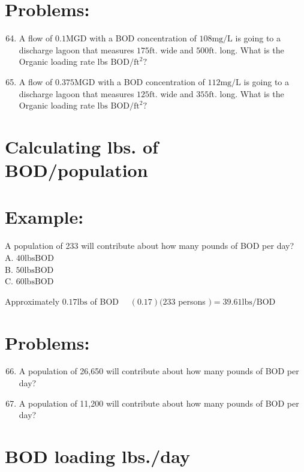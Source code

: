 \documentclass[10pt]{article}
\begin{document}
\section{Problems:}
\begin{enumerate}
  \setcounter{enumi}{63}
  \item A flow of $0.1 \mathrm{MGD}$ with a BOD concentration of $108 \mathrm{mg} / \mathrm{L}$ is going to a discharge lagoon that measures $175 \mathrm{ft}$. wide and $500 \mathrm{ft}$. long. What is the Organic loading rate lbs $\mathrm{BOD} / \mathrm{ft}^{2} ?$

  \item A flow of $0.375 \mathrm{MGD}$ with a BOD concentration of $112 \mathrm{mg} / \mathrm{L}$ is going to a discharge lagoon that measures $125 \mathrm{ft}$. wide and $355 \mathrm{ft}$. long. What is the Organic loading rate $\mathrm{lbs}$ $\mathrm{BOD} / \mathrm{ft}^{2} ?$

\end{enumerate}
\section{Calculating lbs. of BOD/population}
\section{Example:}
A population of 233 will contribute about how many pounds of BOD per day?\\
A. $40 \mathrm{lbs} \mathrm{BOD}$\\
B. $50 \mathrm{lbs} \mathrm{BOD}$\\
C. $60 \mathrm{lbs} \mathrm{BOD}$

Approximately $0.17 \mathrm{lbs}$ of BOD $\quad(0.17)(233$ persons $)=39.61 \mathrm{lbs} / \mathrm{BOD}$

\section{Problems:}
\begin{enumerate}
  \setcounter{enumi}{65}
  \item A population of 26,650 will contribute about how many pounds of BOD per day?

  \item A population of 11,200 will contribute about how many pounds of BOD per day?

\end{enumerate}
\section{BOD loading lbs./day}
\end{document}
